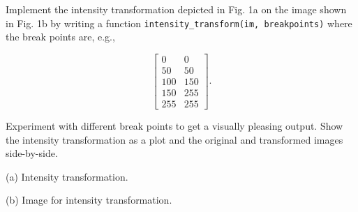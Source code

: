\documentclass[10pt]{article}
\begin{document}
Implement the intensity transformation depicted in Fig. 1a on the image
shown in Fig. 1b by writing a function
\texttt{intensity\_transform(im,\ breakpoints)} where the break points
are, e.g.,

\[
\begin{bmatrix}
0 & 0\\
50 & 50\\
100 & 150\\
150 & 255\\
255 & 255
\end{bmatrix}.
\]

Experiment with different break points to get a visually pleasing
output. Show the intensity transformation as a plot and the original and
transformed images side-by-side.

(a) Intensity transformation.

(b) Image for intensity transformation.
\end{document}
